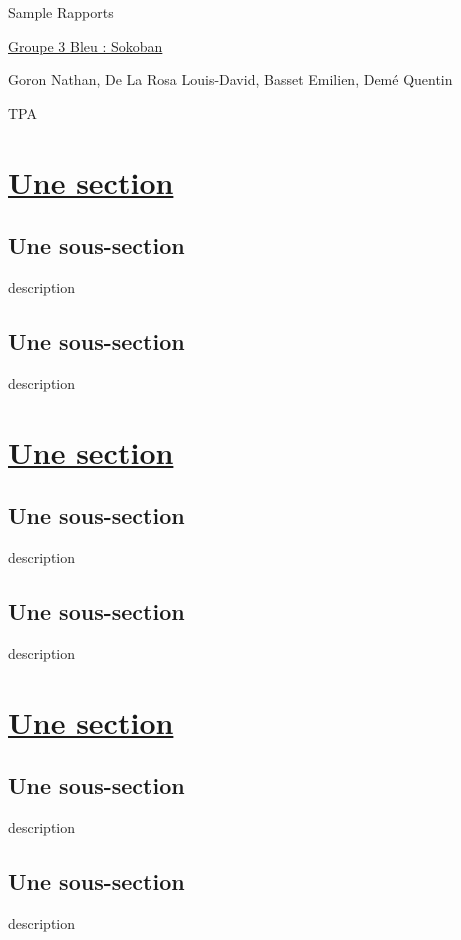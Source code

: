 \documentclass{article}
\begin{document}
\begin{titlepage}
\begin{center}
\Huge Sample Rapports

\normalsize
\vspace{0.5cm}
\Large {\underline{ Groupe 3 Bleu : Sokoban} }

\vspace{1cm}
\normalsize
Goron Nathan, De La Rosa Louis-David, Basset Emilien, Demé Quentin
\end{center}
\end{titlepage}
\vspace{3cm}
TPA

\newpage


\section{\underline{Une section}}
	\subsection{Une sous-section}
	description
	\subsection{Une sous-section}
	description
\vspace{1cm}
\section{\underline{Une section}}
	\subsection{Une sous-section}
	description
	\subsection{Une sous-section}
	description
\vspace{1cm}
\section{\underline{Une section}}
	\subsection{Une sous-section}
	description
	\subsection{Une sous-section}
	description
		

\newpage
\end{document}
